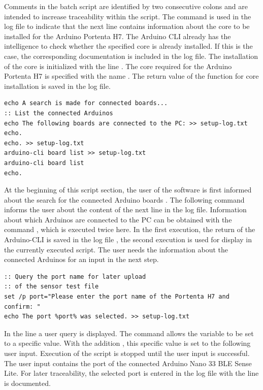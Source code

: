 Comments in the batch script are identified by two consecutive colons  and are intended to increase traceability within the script. The command  is used in the log file to indicate that the next line contains information about the core to be installed for the Arduino Portenta H7. The Arduino CLI already has the intelligence to check whether the specified core is already installed. If this is the case, the corresponding documentation is included in the log file. The installation of the core is initialized with the line . The core required for the Arduino Portenta H7 is specified with the name . The return value of the function for core installation is saved in the log file.

\begin{lstlisting}
echo A search is made for connected boards...
:: List the connected Arduinos
echo The following boards are connected to the PC: >> setup-log.txt
echo.
echo. >> setup-log.txt
arduino-cli board list >> setup-log.txt
arduino-cli board list
echo.
\end{lstlisting}
At the beginning of this script section, the user of the software is first informed about the search for the connected Arduino boards . The following command  informs the user about the content of the next line in the log file. Information about which Arduinos are connected to the PC can be obtained with the command , which is executed twice here. In the first execution, the return of the Arduino-CLI is saved in the log file , the second execution is used for display in the currently executed script. The user needs the information about the connected Arduinos for an input in the next step.

\begin{lstlisting}
:: Query the port name for later upload 
:: of the sensor test file
set /p port="Please enter the port name of the Portenta H7 and confirm: "
echo The port %port% was selected. >> setup-log.txt
\end{lstlisting}

In the line  a user query is displayed. The command  allows the variable  to be set to a specific value. With the addition , this specific value is set to the following user input. Execution of the script is stopped until the user input is successful. The user input contains the port of the connected Arduino Nano 33 BLE Sense Lite. For later traceability, the selected port is entered in the log file with the line  is documented. 

